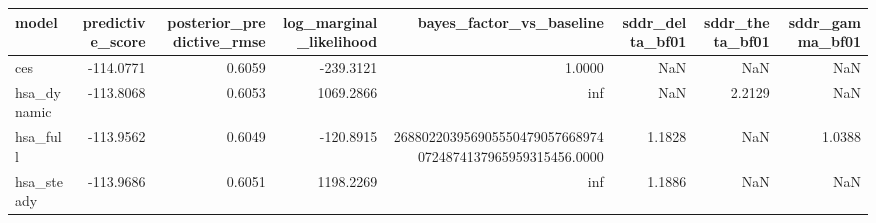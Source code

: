 \begin{tabular}{lrrrrrrr}
\toprule
model & predictive\_score & posterior\_predictive\_rmse & log\_marginal\_likelihood & bayes\_factor\_vs\_baseline & sddr\_delta\_bf01 & sddr\_theta\_bf01 & sddr\_gamma\_bf01 \\
\midrule
ces & -114.0771 & 0.6059 & -239.3121 & 1.0000 & NaN & NaN & NaN \\
hsa\_dynamic & -113.8068 & 0.6053 & 1069.2866 & inf & NaN & 2.2129 & NaN \\
hsa\_full & -113.9562 & 0.6049 & -120.8915 & 2688022039569055504790576689740724874137965959315456.0000 & 1.1828 & NaN & 1.0388 \\
hsa\_steady & -113.9686 & 0.6051 & 1198.2269 & inf & 1.1886 & NaN & NaN \\
\bottomrule
\end{tabular}
